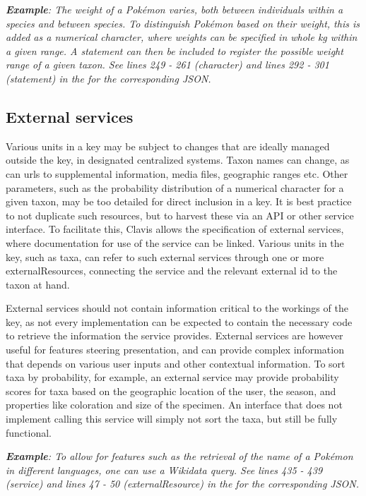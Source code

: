 \documentclass[10pt,letterpaper]{article}
\begin{document}
\textit{\textbf{Example}: The weight of a Pokémon varies, both between individuals within a species and between species. To distinguish Pokémon based on their weight, this is added as a numerical character, where weights can be specified in whole kg within a given range. A statement can then be included to register the possible weight range of a given taxon. See lines 249 - 261 (character) and lines 292 - 301 (statement) in the  for the corresponding JSON.}
\subsection*{
External services
}
Various units in a key may be subject to changes that are ideally managed outside the key, in designated centralized systems. Taxon names can change, as can urls to supplemental information, media files, geographic ranges etc. Other parameters, such as the probability distribution of a numerical character for a given taxon, may be too detailed for direct inclusion in a key. It is best practice to not duplicate such resources, but to harvest these via an API or other service interface. To facilitate this, Clavis allows the specification of external services, where documentation for use of the service can be linked. Various units in the key, such as taxa, can refer to such external services through one or more externalResources, connecting the service and the relevant external id to the taxon at hand.

External services should not contain information critical to the workings of the key, as not every implementation can be expected to contain the necessary code to retrieve the information the service provides. External services are however useful for features steering presentation, and can provide complex information that depends on various user inputs and other contextual information. To sort taxa by probability, for example, an external service may provide probability scores for taxa based on the geographic location of the user, the season, and properties like coloration and size of the specimen. An interface that does not implement calling this service will simply not sort the taxa, but still be fully functional.

\textit{\textbf{Example}: To allow for features such as the retrieval of the name of a Pokémon in different languages, one can use a Wikidata query. See lines 435 - 439 (service) and lines 47 - 50 (externalResource) in the  for the corresponding JSON.}
\end{document}
